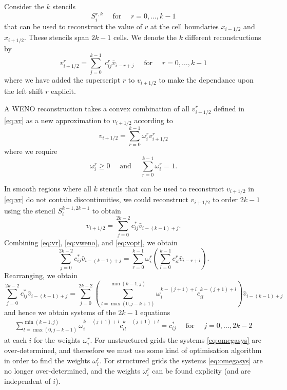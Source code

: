 \documentclass{article}
\newcommand{\for}[0]{\quad \text{ for } \quad}
\newcommand{\xli}[0]{x_{i-1/2}}
\newcommand{\xri}[0]{x_{i+1/2}}
\newcommand{\vri}[0]{v_{i+1/2}}
\numberwithin{equation}{section}
\begin{document}
Consider the $k$ stencils
\begin{equation*}
  S_i^{r,k} \for r=0,\ldots,k-1
\end{equation*}
that can be used to reconstruct the value of $v$ at the cell
boundaries $\xli$ and $\xri$.  These stencils span $2k-1$ cells.  We
denote the $k$ different reconstructions by
\begin{equation}
  \label{eq:vr}
  \vri^r = \sum_{j=0}^{k-1}\; c_{ij}^r \bar{v}_{i-r+j} \for r=0,\dots,k-1
\end{equation}
where we have added the superscript $r$ to $\vri$ to make the
dependance upon the left shift $r$ explicit.

A WENO reconstruction takes a convex combination of all $\vri^r$
defined in \eqref{eq:vr} as a new approximation to $\vri$ according to
\begin{equation}
  \label{eq:vweno}
  \vri = \sum_{r=0}^{k-1} \omega_i^r \vri^r
\end{equation}
where we require
\begin{equation}
  \omega_i^r \geq 0 \quad \text{ and } \quad \sum_{r=0}^{k-1} \omega_i^r = 1.
\end{equation}

In smooth regions where all $k$ stencils that can be used to
reconstruct $\vri$ in \eqref{eq:vr} do not contain discontinuities, we
could reconstruct $\vri$ to order $2k-1$ using the stencil
$S_i^{k-1,2k-1}$ to obtain
\begin{equation}
  \label{eq:vopt}
  \vri = \sum_{j=0}^{2k-2} c_{ij}^* \bar{v}_{i-(k-1)+j}.
\end{equation}
Combining \eqref{eq:vr}, \eqref{eq:vweno}, and \eqref{eq:vopt}, we
obtain
\begin{equation}
  \label{eq:vopt2}
  \sum_{j=0}^{2k-2} c_{ij}^* \bar{v}_{i-(k-1)+j}
    = \sum_{r=0}^{k-1} \omega_i^r \left( \sum_{l=0}^{k-1} c_{il}^r \bar{v}_{i-r+l} \right).
\end{equation}
Rearranging, we obtain
\begin{equation*}
  \sum_{j=0}^{2k-2} c_{ij}^* \bar{v}_{i-(k-1)+j}
    = \sum_{j=0}^{2k-2} \left(
      \sum_{l=\max(0,j-k+1)}^{\min(k-1,j)} \omega_i^{k-(j+1)+l} c_{il}^{k-(j+1)+l}
    \right) \bar{v}_{i-(k-1)+j}
\end{equation*}
and hence we obtain systems of the $2k-1$ equations
\begin{gather}
  \label{eq:omegasys}
  \sum_{l=\max(0,j-k+1)}^{\min(k-1,j)} \omega_i^{k-(j+1)+l} c_{il}^{k-(j+1)+l} = c_{ij}^*
    \for j = 0,\ldots,2k-2
\end{gather}
at each $i$ for the weights $\omega_i^r$.  For unstructured grids the
systems \eqref{eq:omegasys} are over-determined, and thereefore we
must use some kind of optimisation algorithm in order to find the
weights $\omega_i^r$.  For structured grids the systems
\eqref{eq:omegasys} are no longer over-determined, and the weights
$\omega_i^r$ can be found explicity (and are independent of $i$).
\end{document}

